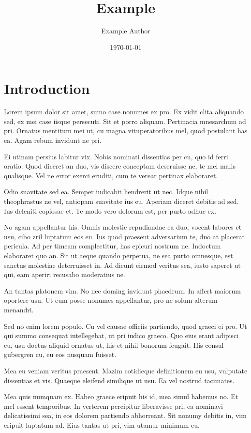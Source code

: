 \documentclass{article}
\title{Example}
\author {Example Author}
\date {\today}
\begin{document}
\maketitle
\listoffigures
\section{Introduction}
Lorem ipsum dolor sit amet, sumo case nonumes ex pro. Ex vidit clita aliquando sed, ex mei case iisque persecuti. Sit et porro aliquam. Pertinacia mnesarchum ad pri. Ornatus mentitum mei ut, cu magna vituperatoribus mel, quod postulant has ea. Agam rebum invidunt ne pri.

Ei utinam persius labitur vix. Nobis nominati dissentias per cu, quo id ferri oratio. Quod diceret an duo, vis discere conceptam deseruisse ne, te mel malis qualisque. Vel ne error exerci eruditi, cum te verear pertinax elaboraret.

Odio suavitate sed ea. Semper iudicabit hendrerit ut nec. Idque nihil theophrastus ne vel, antiopam suavitate ius eu. Aperiam diceret debitis ad sed. Ius deleniti copiosae et. Te modo vero dolorum est, per purto adhuc ex.

No agam appellantur his. Omnis molestie repudiandae ea duo, vocent labores et usu, cibo zril luptatum eos eu. Ius quod praesent adversarium te, duo at placerat pericula. Ad per timeam complectitur, has epicuri nostrum ne. Indoctum elaboraret quo an. Sit ut aeque quando perpetua, ne sea purto omnesque, est sanctus molestiae deterruisset in. Ad dicunt eirmod veritus sea, iusto saperet ut qui, eam aperiri recusabo moderatius ne.

An tantas platonem vim. No nec doming invidunt phaedrum. In affert maiorum oportere usu. Ut eum posse nonumes appellantur, pro ne solum alterum menandri.

Sed no enim lorem populo. Cu vel causae officiis partiendo, quod graeci ei pro. Ut qui summo consequat intellegebat, ut pri iudico graeco. Quo eius erant adipisci cu, usu doctus aliquid ornatus ut, his et nihil bonorum feugait. His consul gubergren cu, eu eos nusquam fuisset.

Mea eu veniam veritus praesent. Mazim cotidieque definitionem eu usu, vulputate dissentias et vis. Quaeque eleifend similique ut usu. Ea vel nostrud tacimates.

Mea quis numquam ex. Habeo graece eripuit his id, mea simul habemus no. Et mel essent temporibus. In verterem percipitur liberavisse pri, ea nominavi delicatissimi sea, in eos dolorem partiendo abhorreant. Sit nonumy debitis in, vim eripuit luptatum ad. Eius tantas ut pri, vim utamur minimum eu.
\end{document}

